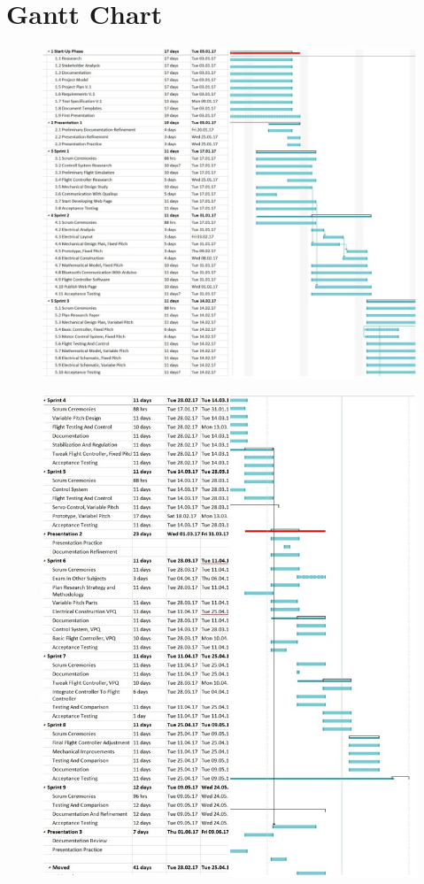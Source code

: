 \chapter{Gantt Chart}
\label{app:gantt}

\begin{figure}[H]
    \centering
    \includegraphics[width = 1\textwidth]{VAPIQ-PICTURES/GanttChart1}
    \label{fig:gantt1}
\end{figure}

\begin{figure}[H]
    \centering
    \includegraphics[width = 1\textwidth]{VAPIQ-PICTURES/GanttChart}
    \label{fig:gantt2}
\end{figure}